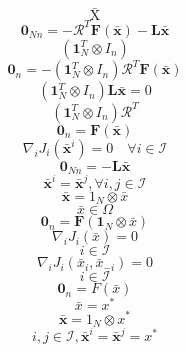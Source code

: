 \documentclass[11pt]{ctexart}
\begin{document}
$$\bar{\mathrm{X}}$$
$$\mathbf{0}_{Nn}=-\mathcal{R}^T\mathbf{F}(\bar{\mathbf{x}})-\mathbf{L}\bar{\mathbf{x}}$$
$$(\mathbf{1}_{N}^{T}\otimes I_{n})$$
$$\mathbf{0}_{n}=-(\mathbf{1}_{N}^{T}\otimes I_{n})\mathcal{R}^{T}\mathbf{F}(\bar{\mathbf{x}})$$
$$(\mathbf{1}_{N}^{T}\otimes I_{n})\mathbf{L}\bar{\mathbf{x}}=0$$
$$(\mathbf{1}_{N}^{T}\otimes I_{n})\mathcal{R}^{T}$$
$$\mathbf{0}_{n}=\mathbf{F}(\bar{\mathbf{x}})$$
$$\nabla_iJ_i(\bar{\mathbf{x}}^i)=0\quad\forall i\in\mathcal{I}$$
$$\mathbf{0}_{Nn}=-\mathbf{L}\mathbf{\bar{x}}$$
$$\bar{\mathbf{x}}^{i}=\bar{\mathbf{x}}^{j},\forall i,j\in\mathcal{I}$$
$${\bar{\mathbf{x}}}=1_{N}\otimes{\bar{x}}$$
$$\bar{x}\in\Omega $$
$$\mathbf{0}_{n}=\mathbf{F}(\mathbf{1}_{N}\otimes\bar{x})$$
$$\nabla_{i}J_{i}(\bar{x})=0$$
$$i\in{\mathcal I}$$
$$\nabla_{i}J_{i}(\bar{x}_{i},\bar{x}_{-i})=0$$
$$i\in\mathcal{I}$$
$$\mathbf{0}_{n}=F(\bar{x})$$
$$\bar{x}=x^{*}$$
$$\bar{\mathbf{x}}=1_{N}\otimes x^{*}$$
$$i,j\in\mathcal{I},\bar{\mathbf{x}}^{i}=\bar{\mathbf{x}}^{j}=x^{*}$$
\end{document}
